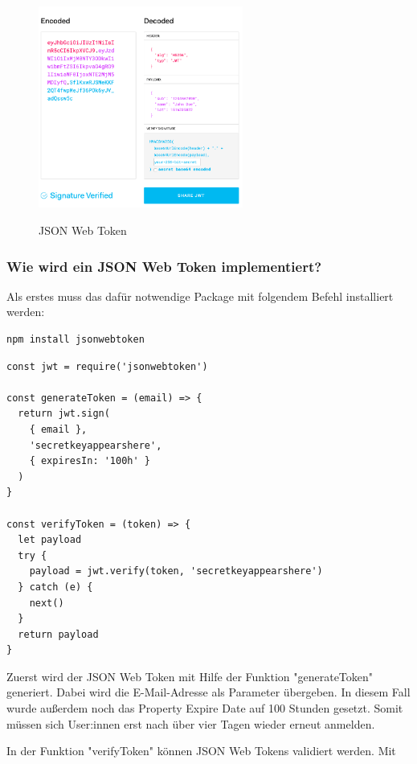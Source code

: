 \begin{figure}[h!]
    \centering
    \includegraphics[width=0.6\textwidth]{pics/jwt.png}
    \caption{JSON Web Token}
    \label{fig:enter-label}
    \cite{decoded_grafik}
\end{figure}

\subsubsection{Wie wird ein JSON Web Token implementiert?}

Als erstes muss das dafür notwendige Package mit folgendem Befehl installiert werden:

\begin{lstlisting}
npm install jsonwebtoken
\end{lstlisting}


\begin{lstlisting}[caption=Implementierung JWT]
const jwt = require('jsonwebtoken')

const generateToken = (email) => {
  return jwt.sign(
    { email },
    'secretkeyappearshere',
    { expiresIn: '100h' }
  )
}

const verifyToken = (token) => {
  let payload
  try {
    payload = jwt.verify(token, 'secretkeyappearshere')
  } catch (e) {
    next()
  }
  return payload
}
\end{lstlisting}

Zuerst wird der JSON Web Token mit Hilfe der Funktion "generateToken" generiert. Dabei wird die E-Mail-Adresse als Parameter übergeben. In diesem Fall wurde außerdem noch das Property Expire Date auf 100 Stunden gesetzt. Somit müssen sich User:innen erst nach über vier Tagen wieder erneut anmelden.

In der Funktion "verifyToken" können JSON Web Tokens validiert werden. Mit

